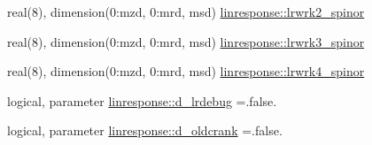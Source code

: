 \begin{DoxyCompactItemize}
\item 
real(8), dimension(0\+:mzd, 0\+:mrd, msd) \hyperlink{namespacelinresponse_a5ba84ba52b63841630c55e3d1bb01e92}{linresponse\+::lrwrk2\+\_\+spinor}
\item 
real(8), dimension(0\+:mzd, 0\+:mrd, msd) \hyperlink{namespacelinresponse_a02ee1e3bbde3436ec55311e4d2688a83}{linresponse\+::lrwrk3\+\_\+spinor}
\item 
real(8), dimension(0\+:mzd, 0\+:mrd, msd) \hyperlink{namespacelinresponse_aed6027bac5361e268d67d07b2d872ec2}{linresponse\+::lrwrk4\+\_\+spinor}
\item 
logical, parameter \hyperlink{namespacelinresponse_a5f0384abf4776063906b14b663a1c54b}{linresponse\+::d\+\_\+lrdebug} =.false.
\item 
logical, parameter \hyperlink{namespacelinresponse_ae22c6f582e8f07c7cfa7edba466d7641}{linresponse\+::d\+\_\+oldcrank} =.false.
\end{DoxyCompactItemize}
